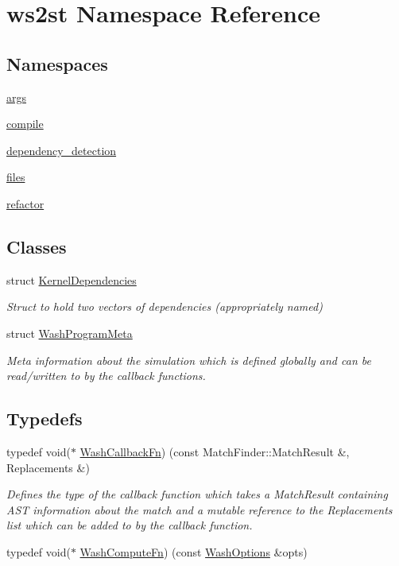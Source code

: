 \hypertarget{namespacews2st}{}\section{ws2st Namespace Reference}
\label{namespacews2st}
\subsection*{Namespaces}
\begin{DoxyCompactItemize}
\item 
 \mbox{\hyperlink{namespacews2st_1_1args}{args}}
\item 
 \mbox{\hyperlink{namespacews2st_1_1compile}{compile}}
\item 
 \mbox{\hyperlink{namespacews2st_1_1dependency__detection}{dependency\+\_\+detection}}
\item 
 \mbox{\hyperlink{namespacews2st_1_1files}{files}}
\item 
 \mbox{\hyperlink{namespacews2st_1_1refactor}{refactor}}
\end{DoxyCompactItemize}
\subsection*{Classes}
\begin{DoxyCompactItemize}
\item 
struct \mbox{\hyperlink{structws2st_1_1KernelDependencies}{Kernel\+Dependencies}}
\begin{DoxyCompactList}\small\item\em Struct to hold two vectors of dependencies (appropriately named) \end{DoxyCompactList}\item 
struct \mbox{\hyperlink{structws2st_1_1WashProgramMeta}{Wash\+Program\+Meta}}
\begin{DoxyCompactList}\small\item\em Meta information about the simulation which is defined globally and can be read/written to by the callback functions. \end{DoxyCompactList}\end{DoxyCompactItemize}
\subsection*{Typedefs}
\begin{DoxyCompactItemize}
\item 
typedef void($\ast$ \mbox{\hyperlink{namespacews2st_a682dfda40d8282c7e579a7b826a7d861}{Wash\+Callback\+Fn}}) (const Match\+Finder\+::\+Match\+Result \&, Replacements \&)
\begin{DoxyCompactList}\small\item\em Defines the type of the callback function which takes a Match\+Result containing A\+ST information about the match and a mutable reference to the Replacements list which can be added to by the callback function. \end{DoxyCompactList}\item 
typedef void($\ast$ \mbox{\hyperlink{namespacews2st_a77544d74f310dc9ec5c11bffa3ea77b6}{Wash\+Compute\+Fn}}) (const \mbox{\hyperlink{structWashOptions}{Wash\+Options}} \&opts)
\end{DoxyCompactItemize}
